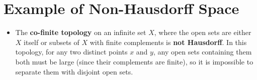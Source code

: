 \documentclass{article}
\begin{document}
\section{Example of Non-Hausdorff Space}
\begin{itemize}
    \item The \textbf{co-finite topology} on an infinite set $X$, where the open sets are either $X$ itself or
    subsets of $X$ with finite complements is \textbf{not Hausdorff}. In this topology, for any two distinct points
    $x$ and $y$, any open sets containing them both must be large (since their complements are finite),
    so it is impossible to separate them with disjoint open sets.
\end{itemize}
\end{document}
